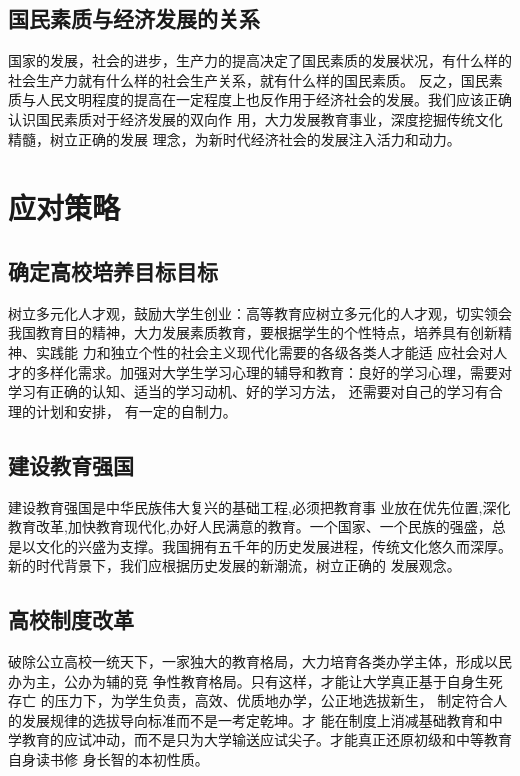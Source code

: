 \documentclass[UTF8]{ctexart}
\begin{document}
	\subsection{国民素质与经济发展的关系}
	国家的发展，社会的进步，生产力的提高决定了国民素质的发展状况\textsuperscript{\cite{MYB}}，有什么样的社会生产力就有什么样的社会生产关系，就有什么样的国民素质。 反之，国民素质与人民文明程度的提高在一定程度上也反作用于经济社会的发展。我们应该正确认识国民素质对于经济发展的双向作 用，大力发展教育事业，深度挖掘传统文化精髓，树立正确的发展 理念，为新时代经济社会的发展注入活力和动力。
\section{应对策略}
	\subsection{确定高校培养目标目标}
	树立多元化人才观，鼓励大学生创业：高等教育应树立多元化的人才观，切实领会我国教育目的精神，大力发展素质教育，要根据学生的个性特点，培养具有创新精神、实践能 力和独立个性的社会主义现代化需要的各级各类人才能适 应社会对人才的多样化需求。加强对大学生学习心理的辅导和教育：良好的学习心理，需要对学习有正确的认知、适当的学习动机、好的学习方法， 还需要对自己的学习有合理的计划和安排， 有一定的自制力\textsuperscript{\cite{CXF}}。
	\subsection{建设教育强国}
	建设教育强国是中华民族伟大复兴的基础工程,必须把教育事 业放在优先位置,深化教育改革,加快教育现代化,办好人民满意的教育。一个国家、一个民族的强盛，总是以文化的兴盛为支撑。我国拥有五千年的历史发展进程，传统文化悠久而深厚。新的时代背景下，我们应根据历史发展的新潮流，树立正确的 发展观念。
	\subsection{高校制度改革}
	破除公立高校一统天下，一家独大的教育格局，大力培育各类办学主体，形成以民办为主，公办为辅的竞 争性教育格局。只有这样，才能让大学真正基于自身生死存亡 的压力下，为学生负责，高效、优质地办学，公正地选拔新生， 制定符合人的发展规律的选拔导向标准而不是一考定乾坤。才 能在制度上消减基础教育和中学教育的应试冲动，而不是只为大学输送应试尖子。才能真正还原初级和中等教育自身读书修 身长智的本初性质。
	


\end{document}
